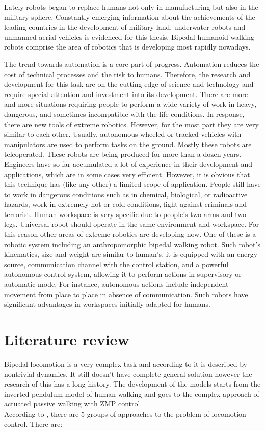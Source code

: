 \documentclass[12pt,a4paper]{report}
\begin{document}
		Lately robots began to replace humans not only in manufacturing but also in the military sphere. Constantly emerging information about the achievements of the leading countries in the development of military land, underwater robots and unmanned aerial vehicles is evidenced for this thesis. Bipedal humanoid walking robots comprise the area of robotics that is developing most rapidly nowadays.
		
		The trend towards automation is a core part of progress. Automation reduces the cost of technical processes and the risk to humans. Therefore, the research and development for this task are on the cutting edge of science and technology and require special attention and investment into its development. There are more and more situations requiring people to perform a wide variety of work in heavy, dangerous, and sometimes incompatible with the life conditions. In response, there are new tools of extreme robotics. However, for the most part they are very similar to each other. Usually, autonomous wheeled or tracked vehicles with manipulators are used to perform tasks on the ground. Mostly these robots are teleoperated. These robots are being produced for more than a dozen years. Engineers have so far accumulated a lot of experience in their development and applications, which are in some cases very efficient. However, it is obvious that this technique has (like any other) a limited scope of application. People still have to work in dangerous conditions such as in chemical, biological, or radioactive hazards, work in extremely hot or cold conditions, fight against criminals and terrorist.
		Human workspace is very specific due to people's two arms and two legs. Universal robot should operate in the same environment and workspace. For this reason other areas of extreme robotics are developing now.
		One of these is a robotic system including an anthropomorphic bipedal walking robot. Such robot's kinematics, size and weight are similar to human's, it is equipped with an energy source, communication channel with the control station, and a powerful autonomous control system, allowing it to perform actions in supervisory or automatic mode. For instance, autonomous actions include independent movement from place to place in absence of communication. Such robots have significant advantages in workspaces initially adapted for humans.

	\chapter{Literature review}
		Bipedal locomotion is a very complex task and according to \cite{erbatur2002study} it is described by nontrivial dynamics. It still doesn't have complete general solution however the research of this has a long history. The development of the models starts from the inverted pendulum model of human walking and goes to the complex approach of actuated passive walking with ZMP control.\\
		According to \cite{wright2014intelligent}, there are 5 groups of approaches to the problem of locomotion control. There are:
		
\end{document}
